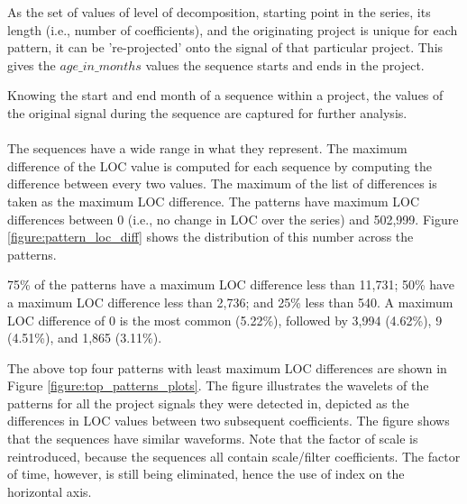 As the set of values of level of decomposition, starting point in the series,
its length (i.e., number of coefficients), and the originating project is
unique for each pattern, it can be 're-projected' onto the signal of that
particular project. This gives the $age\_in\_months$ values the sequence starts
and ends in the project.

Knowing the start and end month of a sequence within a project, the values of
the original signal during the sequence are captured for further analysis.

\paragraph{}
The sequences have a wide range in what they represent. The maximum difference
of the LOC value is computed for each sequence by computing the difference
between every two values. The maximum of the list of differences is taken as
the maximum LOC difference. The patterns have maximum LOC differences between 0
(i.e., no change in LOC over the series) and 502,999. Figure
\ref{figure:pattern_loc_diff} shows the distribution of this number across the
patterns.



75\% of the patterns have a maximum LOC difference less than 11,731; 50\% have a
maximum LOC difference less than 2,736; and 25\% less than 540. A maximum LOC
difference of 0 is the most common (5.22\%), followed by 3,994 (4.62\%), 9
(4.51\%), and 1,865 (3.11\%).

The above top four patterns with least maximum LOC differences are shown in
Figure \ref{figure:top_patterns_plots}. The figure illustrates the wavelets of
the patterns for all the project signals they were detected in, depicted as the
differences in LOC values between two subsequent coefficients.
The figure shows that the sequences have similar waveforms. Note that the
factor of scale is reintroduced, because the sequences all contain scale/filter
coefficients. The factor of time, however, is still being eliminated, hence the
use of index on the horizontal axis.



\begin{comment}
- Factual results
- Tables and figures for clarification

This chapter presents and clarifies the results obtained during the research.
The focus should be on the factual results, not the interpretation or
discussion. Tables and graphics should be used to increase the clarity of the
results where applicable.
Have a look at the the results chapter in this example thesis on Paul’s
homepage\footnote{http://homepages.cwi.nl/~paulk/thesesMasterSoftwareEngineering/2006/ArnoldLankamp.pdf}.
\end{comment}
